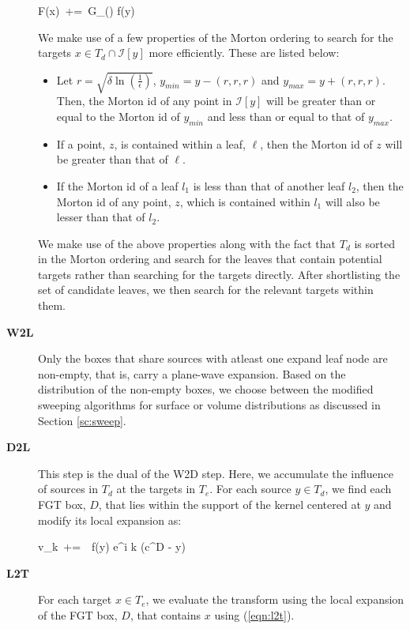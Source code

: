 \begin{description}
\beq F(x) \,+=\, G_\delta() f(y) \label{eqn:d2d} \eeq

We make use of a few properties of the Morton ordering to search for the targets $x \in T_d \cap \mathcal{I}[y]$ more efficiently. These
are listed below:
\begin{itemize}
\item Let $r = \sqrt{\delta \ln (\frac{1}{\epsilon})}$, $y_{min} = y - (r, r, r)$ and $y_{max} = y + (r, r, r)$. Then, the Morton id of any point in $\mathcal{I}[y]$ will be greater than or equal to the Morton id of $y_{min}$ and less than or equal to that of $y_{max}$.
\item If a point, $z$, is contained within a leaf, $\ell$, then the Morton id of $z$ will be greater than that of $\ell$.
\item If the Morton id of a leaf $l_1$ is less than that of another leaf $l_2$, then the Morton id of any point, $z$, which is
 contained within $l_1$ will also be lesser than that of $l_2$.
\end{itemize}

 We make use of the above properties along with the fact that $T_d$ is sorted in the Morton ordering and
 search for the leaves that contain potential targets rather than searching for the targets directly. After
 shortlisting the set of candidate leaves, we then search for the relevant targets within them.

\item[\textbf{W2L}] Only the boxes that share sources with atleast one expand leaf node are non-empty, that is,
 carry a plane-wave expansion. Based on the distribution of the non-empty boxes, we choose between the modified sweeping
 algorithms for surface or volume distributions as discussed in Section \ref{sc:sweep}. 

\item[\textbf{D2L}] This step is the dual of the W2D step. Here, we accumulate the influence of sources 
in $T_d$ at the targets in $T_e$. For each source $y \in T_d$, we find each FGT box, $D$, that lies within
 the support of the kernel centered at $y$ and modify its local expansion as: 

\beq v_k  \,+=\, \, f(y) e^{i \lambda k \cdot (c^D - y)} \label{eqn:d2l} \eeq

\item[\textbf{L2T}] For each target $x \in T_e$, we evaluate the transform using the local 
expansion of the FGT box, $D$, that contains $x$ using (\ref{eqn:l2t}).
\end{description}



